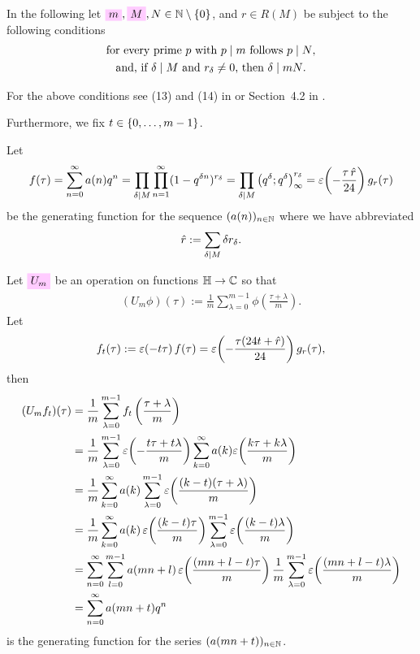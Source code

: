 \documentclass{article}
\begin{document}
In the following let
$\defineNotation[m]{m},
\defineNotation[M]{M},
N \in \setN \setminus \Set{0}$, and
$r \in R(M)$
be subject to the following conditions
\begin{gather}
  \text{for every prime $p$ with $p \mid m$ follows $p \mid N$,}
  \label{eq:p|m=>p|N}\\
  \text{and, if $\delta \mid M$ and $r_\delta\ne0$, then
    $\delta \mid mN$.}
  \label{eq:delta|M=>delta|mN}
\end{gather}

For the above conditions see (13) and (14) in
\cite{Radu:AlgorithmicApproachRamanujanCongruences:2009} or
Section~4.2 in \cite{Radu:PhD:2010}.

Furthermore, we fix $t\in\left\{0,\ldots,m-1\right\}$.


Let
\begin{gather*}
  f(\tau)
  =
  \sum_{n=0}^\infty a(n) q^n
  =
  \prod_{\delta \mid M}\prod_{n=1}^\infty(1-q^{\delta n})^{r_\delta}
  =
  \prod_{\delta \mid M}\left( q^{\delta};q^{\delta} \right)_{\infty}^{r_\delta}
  =
  \varepsilon\!\left(-\frac{\tau \, \hat{r}}{24}\right) g_r(\tau)
\end{gather*}
be the generating function for the sequence $(a(n))_{n\in\mathbb{N}}$
where we have abbreviated
\begin{gather}
  \hat{r} := \sum_{\delta \mid M} \delta r_\delta.
  \label{eq:sumdelta}
\end{gather}

Let $\defineNotation[U-m]{U_m}$ be an operation on functions
$\mathbb{H}\to\mathbb{C}$ so that
\begin{gather}
  (U_m\phi)(\tau) := \frac{1}{m}\sum_{\lambda=0}^{m-1}
  \phi\left(\frac{\tau+\lambda}{m}\right).
  \label{eq:U_m}
\end{gather}
Let
\begin{gather}
  f_t(\tau)
  :=\varepsilon\!\left(-t\tau\right)f(\tau)
  = \varepsilon\!\left(-\frac{\tau (24 t + \hat{r})}{24}\right) g_r(\tau),
  \label{eq:f_t}
\end{gather}
then
\begin{align}
  (U_mf_t)(\tau)
  &=
  \frac{1}{m} \sum_{\lambda=0}^{m-1}f_t\left(\frac{\tau+\lambda}{m}\right)
  \notag
  \\
  &=
  \frac{1}{m} \sum_{\lambda=0}^{m-1}
  \varepsilon\!\left(-\frac{t\tau+t\lambda}{m}\right)
  \sum_{k=0}^\infty a(k) \varepsilon\!\left(\frac{k\tau+k\lambda}{m}\right)
  \notag
  \\
  &=
  \frac{1}{m}
  \sum_{k=0}^\infty
  a(k)
  \sum_{\lambda=0}^{m-1}
  \varepsilon\!\left(\frac{(k-t)(\tau+\lambda)}{m}\right)
  \notag
  \\
  &=
  \frac{1}{m}
  \sum_{k=0}^\infty
  a(k)\,
  \varepsilon\!\left(\frac{(k-t)\tau}{m}\right)
  \sum_{\lambda=0}^{m-1}
  \varepsilon\!\left(\frac{(k-t)\lambda}{m}\right)
  \notag
  \\
  &=
    \sum_{n=0}^\infty
    \sum_{l=0}^{m-1} a(mn+l)\,
    \varepsilon\!\left(\frac{(mn+l-t)\tau}{m}\right)
    \frac{1}{m}
    \sum_{\lambda=0}^{m-1}\varepsilon\!\left(\frac{(mn+l-t)\lambda}{m}\right)
    \notag
  \\
  &=
    \sum_{n=0}^\infty a(mn+t) q^n
  \label{eq:U_m-f_t}
\end{align}
is the generating function for the series
$(a(mn+t))_{n\in\mathbb{N}}$.
\end{document}
